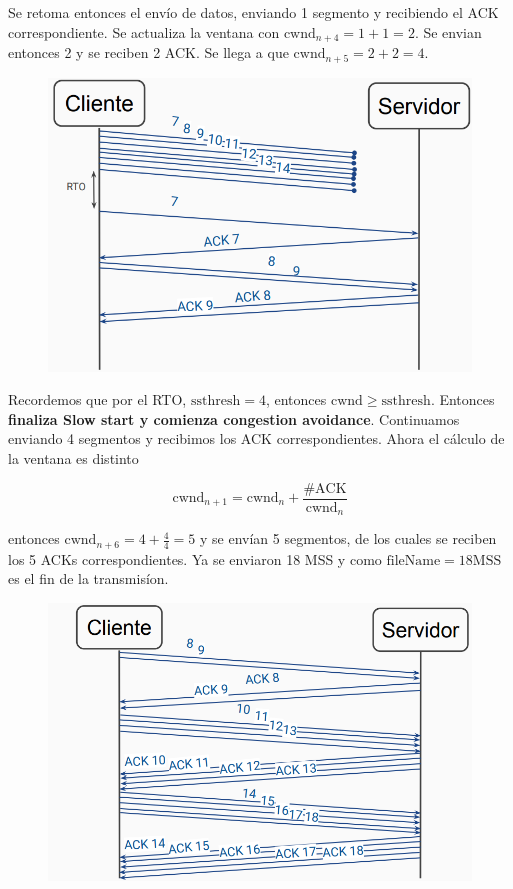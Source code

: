 Se retoma entonces el envío de datos, enviando 1 segmento y recibiendo el ACK correspondiente. Se actualiza la ventana con $\mathrm{cwnd}_{n+4} = 1 +1 = 2$. Se envian entonces 2 y se reciben 2 ACK. Se llega a que $\mathrm{cwnd}_{n+5} = 2 + 2 = 4 $. 

\begin{figure}[H]
\centering
\includegraphics[width=\textwidth]{imagenes/resolucion4.png}
\end{figure}

Recordemos que por el RTO,  $ \mathrm{ssthresh} = 4 $, entonces $\mathrm{cwnd} \geq \mathrm{ssthresh} $. Entonces \textbf{finaliza Slow start y comienza congestion avoidance}.
Continuamos enviando 4 segmentos y recibimos los ACK correspondientes.
Ahora el cálculo de la ventana es distinto

$$ \mathrm{cwnd}_{n+1} = \mathrm{cwnd}_n + \frac{\#\mathrm{ACK}}{\mathrm{cwnd}_n} $$

entonces  $\mathrm{cwnd}_{n+6} = 4 + \frac{4}{4} = 5 $ y se envían 5 segmentos, de los cuales se reciben los 5 ACKs correspondientes. Ya se enviaron 18 MSS y como $\mathrm{fileName} = 18 \mathrm{MSS} $ es el fin de la transmisíon. 

\begin{figure}[H]
\centering
\includegraphics[width=\textwidth]{imagenes/resolucion5.png}
\end{figure}

